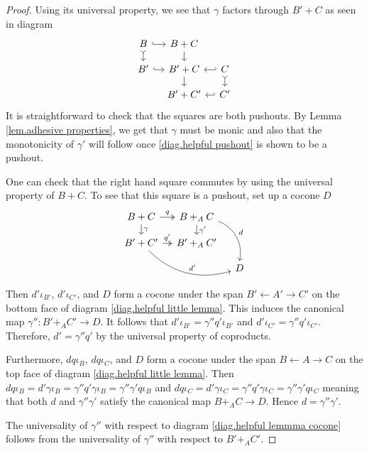 \documentclass[11pt]{amsart}
\newcommand{\from}{\colon}
\theoremstyle{remark}
\theoremstyle{definition}
\begin{document}
\begin{proof}
	Using its universal property, we see that 
	$\gamma$ factors through $B'+C$ as seen in 
	diagram
	\[
	\begin{tikzcd}[column sep=1em, row sep=1em]
		{B} 
			\ar[r,hookrightarrow]  
			\ar[d,rightarrowtail] &
		{B+C} 
			\ar[d]&
		{} \\
		{B'} 
			\ar[r,hookrightarrow]&
		{B'+C} 
			\ar[d]
			\ar[r,hookleftarrow] &
		{C} 
			\ar[d,rightarrowtail]\\
		{} &
		{B'+C'}
			\ar[r,hookleftarrow] &
		{C'} 
	\end{tikzcd}
	\]	
	It is straightforward to check that the squares are both pushouts. By Lemma \ref{lem.adhesive properties}, we get that $\gamma$ must be monic and also that the monotonicity of $\gamma'$ will follow once \eqref{diag.helpful pushout} is shown to be a pushout.
	
	One can check that the right hand square commutes by using the universal property of $B+C$. To see that this square is a pushout, set up a cocone $D$
	\begin{equation} 
	\label{diag.helpful lemmma cocone}
	\begin{tikzcd}[column sep=1em,row sep=1em]
	{B+C} 
	\ar[r,twoheadrightarrow, "q"] 
	\ar[d,"\gamma"] &
	{B+_AC} 
	\ar[d,"\gamma'"]
	\ar[ddr,bend left=40,"d"]&
	{} \\
	{B'+C'} 
	\ar[r,twoheadrightarrow,"q'"] 
	\ar[drr,bend right=30,"d'"]&
	{B'+_AC'} &
	{}  \\
	{} &
	{} &
	{D} 
	\end{tikzcd}
	\end{equation}
	Then $d'\iota_{B'}$, $d'\iota_{C'}$, and $D$ form a cocone under the span $B' \leftarrow A' \to C'$ on the bottom face of diagram \eqref{diag.helpful little lemma}. This induces the canonical map $\gamma'' \from B'+_AC' \to D$.  It follows that $d'\iota_{B'}=\gamma'' q' \iota_{B'}$ and $d'\iota_{C'}=\gamma'' q' \iota_{C'}$. Therefore, $d'=\gamma'' q'$ by the universal property of coproducts.
	
	Furthermore, $dq\iota_B$, $dq\iota_C$, and $D$ form a cocone under the span $B \leftarrow A \to C$ on the top face of diagram \eqref{diag.helpful little lemma}. Then $dq\iota_B = d'\gamma\iota_B = \gamma'' q'\gamma\iota_B = \gamma'' \gamma' q \iota_B$ and $dq\iota_C = d'\gamma\iota_C = \gamma'' q'\gamma\iota_C = \gamma'' \gamma' q \iota_C$ meaning that both $d$ and $\gamma''\gamma'$ satisfy the canonical map $B+_AC \to D$.  Hence $d=\gamma''\gamma'$. 
	
	The universality of $\gamma''$ with respect to diagram \eqref{diag.helpful lemmma cocone} follows from the universality of $\gamma''$ with respect to $B'+_AC'$.
\end{proof}
%
%
%
%
%
%
\end{document}
